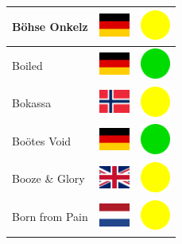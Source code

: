 \documentclass[12pt, a4paper, twoside]{report}
\begin{document}
\begin{center}
\begin{longtable}{|p{5cm}|p{2cm}|p{2cm}|}
 Böhse Onkelz                                               & \includegraphics[width=1cm]{../img/flags/de} &   \includegraphics[width=1cm]{../likes/m} \\ \hline
 Boiled                                                     & \includegraphics[width=1cm]{../img/flags/de} &   \includegraphics[width=1cm]{../likes/y} \\ \hline
 Bokassa                                                    & \includegraphics[width=1cm]{../img/flags/no} &   \includegraphics[width=1cm]{../likes/m} \\ \hline
 Boötes Void                                                & \includegraphics[width=1cm]{../img/flags/de} &   \includegraphics[width=1cm]{../likes/y} \\ \hline
 Booze \& Glory                                             & \includegraphics[width=1cm]{../img/flags/gb} &   \includegraphics[width=1cm]{../likes/m} \\ \hline
 Born from Pain                                             & \includegraphics[width=1cm]{../img/flags/nl} &   \includegraphics[width=1cm]{../likes/m} \\ \hline

\end{longtable}
\end{center}
\end{document}
